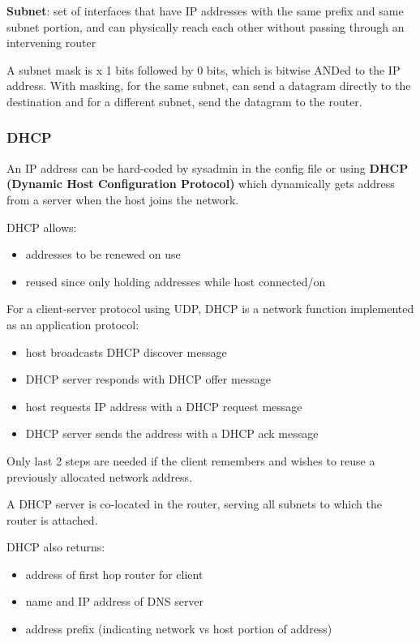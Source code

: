 \documentclass[11pt]{article}
\begin{document}
\textbf{Subnet}: set of interfaces that have IP addresses with the same
prefix and same subnet portion, and can physically reach each other
without passing through an intervening router

A subnet mask is x 1 bits followed by 0 bits, which is bitwise ANDed
to the IP address.
With masking, for the same subnet, can send a datagram directly to the
destination and for a different subnet, send the datagram to the router.
\subsubsection{DHCP}
\label{sec:org7b337c2}
An IP address can be hard-coded by sysadmin in the config file or using
\textbf{DHCP (Dynamic Host Configuration Protocol)} which dynamically gets
address from a server when the host joins the network.

DHCP allows:
\begin{itemize}
\item addresses to be renewed on use
\item reused since only holding addresses while host connected/on
\end{itemize}

For a client-server protocol using UDP, DHCP is a network function
implemented as an application protocol:
\begin{itemize}
\item host broadcasts DHCP discover message
\item DHCP server responds with DHCP offer message
\item host requests IP address with a DHCP request message
\item DHCP server sends the address with a DHCP ack message
\end{itemize}

Only last 2 steps are needed if the client remembers and wishes
to reuse a previously allocated network address.

A DHCP server is co-located in the router, serving all subnets to which
the router is attached.

DHCP also returns:
\begin{itemize}
\item address of first hop router for client
\item name and IP address of DNS server
\item address prefix (indicating network vs host portion of address)
\end{itemize}
\end{document}
